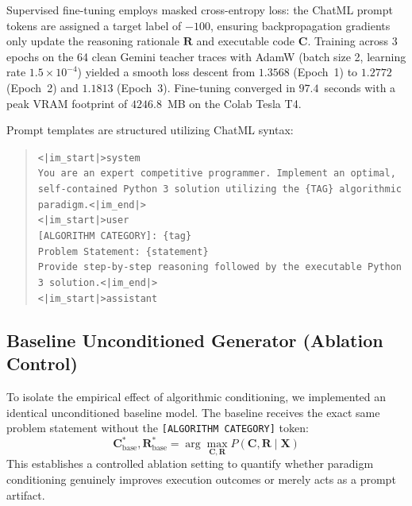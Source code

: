 \documentclass[lettersize,journal]{IEEEtran}
\begin{document}
Supervised fine-tuning employs masked cross-entropy loss: the ChatML prompt tokens are assigned a target label of $-100$, ensuring backpropagation gradients only update the reasoning rationale $\mathbf{R}$ and executable code $\mathbf{C}$. Training across 3 epochs on the 64 clean Gemini teacher traces with AdamW (batch size 2, learning rate $1.5 \times 10^{-4}$) yielded a smooth loss descent from $1.3568$ (Epoch~1) to $1.2772$ (Epoch~2) and $1.1813$ (Epoch~3). Fine-tuning converged in $97.4$~seconds with a peak VRAM footprint of $4246.8$~MB on the Colab Tesla T4.

Prompt templates are structured utilizing ChatML syntax:
\begin{quote}
\small
\texttt{<|im\_start|>system}\\
\texttt{You are an expert competitive programmer. Implement an optimal, self-contained Python 3 solution utilizing the \{TAG\} algorithmic paradigm.<|im\_end|>}\\
\texttt{<|im\_start|>user}\\
\texttt{[ALGORITHM CATEGORY]: \{tag\}}\\
\texttt{Problem Statement: \{statement\}}\\
\texttt{Provide step-by-step reasoning followed by the executable Python 3 solution.<|im\_end|>}\\
\texttt{<|im\_start|>assistant}
\end{quote}

\subsection{Baseline Unconditioned Generator (Ablation Control)}
To isolate the empirical effect of algorithmic conditioning, we implemented an identical unconditioned baseline model. The baseline receives the exact same problem statement without the \texttt{[ALGORITHM CATEGORY]} token:
\begin{equation}
\mathbf{C}_\text{base}^*, \mathbf{R}_\text{base}^* = \arg\max_{\mathbf{C}, \mathbf{R}} P(\mathbf{C}, \mathbf{R} \mid \mathbf{X})
\end{equation}
This establishes a controlled ablation setting to quantify whether paradigm conditioning genuinely improves execution outcomes or merely acts as a prompt artifact.
\end{document}
